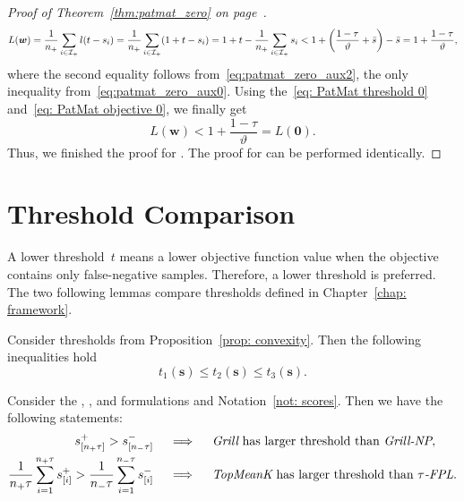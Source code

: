 \begin{proof}[Proof of Theorem~\ref{thm:patmat_zero} on page~\pageref{thm:patmat_zero}]
\begin{equation*}
    L(\bm{w})
      = \frac{1}{\npos}\sum_{i \in \Ipos}l(t-s_i)
      = \frac{1}{\npos}\sum_{i \in \Ipos}\Brac{1+t-s_i}
      = 1 + t - \frac{1}{\npos}\sum_{i \in \Ipos} s_i
      < 1 + \Brac{\frac{1 - \tau}{\vartheta} + \bar{s}} - \bar{s}
      = 1 + \frac{1-\tau}{\vartheta},  
  \end{equation*}
  where the second equality follows from~\eqref{eq:patmat_zero_aux2}, the only inequality from~\eqref{eq:patmat_zero_aux0}. Using the~\eqref{eq: PatMat threshold 0} and~\eqref{eq: PatMat objective 0}, we finally get
  \begin{equation*}
    L(\bm{w})
      < 1 + \frac{1-\tau}{\vartheta}
      = L(\bm{0}).
  \end{equation*}
  Thus, we finished the proof for \PatMat. The proof for \PatMatNP can be performed identically.
\end{proof}

\section{Threshold Comparison}\label{app:relations}

A lower threshold~$t$ means a lower objective function value when the objective contains only false-negative samples. Therefore, a lower threshold is preferred. The two following lemmas compare thresholds defined in Chapter~\ref{chap: framework}.

\begin{lemma}\label{prop: threholds}
  Consider thresholds from Proposition~\ref{prop: convexity}. Then the following inequalities hold
  \begin{equation*}
    t_1(\bm{s}) \leq t_2(\bm{s}) \leq t_3(\bm{s}).
  \end{equation*}
\end{lemma}

\begin{lemma}\label{lemma:thresholds2}
  Consider the \Grill, \GrillNP, \TopMeanK and \tauFPL formulations and Notation~\ref{not: scores}. Then we have the following statements:
  \begin{equation*}
    \begin{aligned}
      s_{[n_{+}\tau]}^+ > s_{[n_{-}\tau]}^- \quad
        & \implies \quad \emph{Grill} \text{ has larger threshold than }\emph{Grill-NP}, \\
      \frac{1}{n_{+}\tau}\sum_{i=1}^{n_{+}\tau} s_{[i]}^+
      > \frac{1}{n_{-}\tau}\sum_{i=1}^{n_{-}\tau} s_{[i]}^- \quad
        & \implies \quad \emph{TopMeanK} \text{ has larger threshold than }{\emph{$\tau$-FPL}}. \\
    \end{aligned}
  \end{equation*}
\end{lemma}

